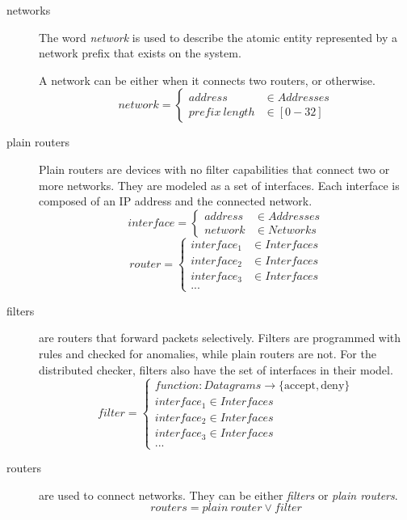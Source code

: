 \begin{description}
	\item[networks] {
		The word \emph{network} is used to describe the atomic entity
		represented by a network prefix that exists on the system.

		A network can be either  when it connects two
		routers, or  otherwise.
		\begin{equation*}
			network =
			\begin{cases}
				address & \in Addresses \\
				prefix~length & \in [0-32]
			\end{cases}
		\end{equation*}
		}
	\item[plain routers] {
		Plain routers are devices with no filter capabilities that connect two
		or more networks. They are modeled as a set of interfaces. Each
		interface is composed of an IP address and the connected network.
		\begin{equation*}
			interface =
			\begin{cases}
				address & \in Addresses \\
				network & \in Networks
			\end{cases}
		\end{equation*}
		\begin{equation*}
			router =
			\begin{cases}
				interface_1 & \in Interfaces \\
				interface_2 & \in Interfaces \\
				interface_3 & \in Interfaces \\
				...
			\end{cases}
		\end{equation*}
		}
	\item[filters] {
		are routers that forward
		packets selectively. Filters are programmed with rules and checked for
		anomalies, while plain routers are not. For the distributed checker,
		filters also have the set of interfaces in their model.
		\begin{equation*}
			filter =
			\begin{cases}
				function : Datagrams \rightarrow \{ \mbox{accept}, \mbox{deny} \} \\
				interface_1 \in Interfaces \\
				interface_2 \in Interfaces \\
				interface_3 \in Interfaces \\
				...
			\end{cases}
		\end{equation*}
		}
	\item[routers] {
		are used to connect networks. They can be either
		\emph{filters} or \emph{plain routers}.
		\begin{equation*}
			routers = plain~router \vee filter
		\end{equation*}
		}
\end{description}

